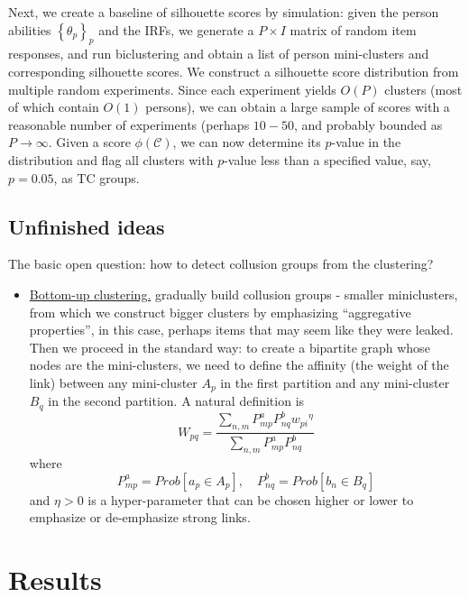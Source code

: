 \documentclass{article}
\newcommand{\cC}{\mathcal{C}}
\begin{document}
Next, we create a baseline of silhouette scores by simulation: given the person abilities $\left\{\theta_p\right\}_p$ and the IRFs, we generate a $P \times I$ matrix of random item responses, and run biclustering and obtain a list of person mini-clusters and corresponding silhouette scores. We construct a silhouette score distribution from multiple random experiments. Since each experiment yields $O(P)$ clusters (most of which contain $O(1)$ persons), we can obtain a large sample of scores with a reasonable number of experiments (perhaps $10-50$, and probably bounded as $P \longrightarrow \infty$. Given a score $\phi(\cC)$, we can now determine its $p$-value in the distribution and flag all clusters with $p$-value less than a specified value, say, $p = 0.05$, as TC groups.

\subsection{Unfinished ideas}
The basic open question: how to detect collusion groups from the clustering?
\begin{itemize}
  \item \underline{Bottom-up clustering.} gradually build collusion groups - smaller miniclusters, from which we construct bigger clusters by emphasizing ``aggregative properties'', in this case, perhaps items that may seem like they were leaked. Then we proceed in the standard way: to create a bipartite graph whose nodes are the mini-clusters, we need to define  the affinity (the weight of the link) between any mini-cluster $A_p$ in the first partition and any mini-cluster $B_q$ in the second partition. A natural definition is
\begin{equation}
W_{pq} = \frac{\sum_{n,m} P^a_{mp}P^b_{nq}{w_{pi}}^\eta}{ \sum_{n,m}P^a_{mp}P^b_{nq}}
\label{eqn:b2}
\end{equation}
where
\begin{equation}
P^a_{mp} = Prob \left[a_p \in A_p\right], \quad P^b_{nq} = Prob \left[ b_n \in B_q \right]
\end{equation}
and $\eta>0$ is a hyper-parameter that can be chosen higher or lower to emphasize or de-emphasize strong links.
\end{itemize}

\section{Results}
\label{results}
\end{document}
